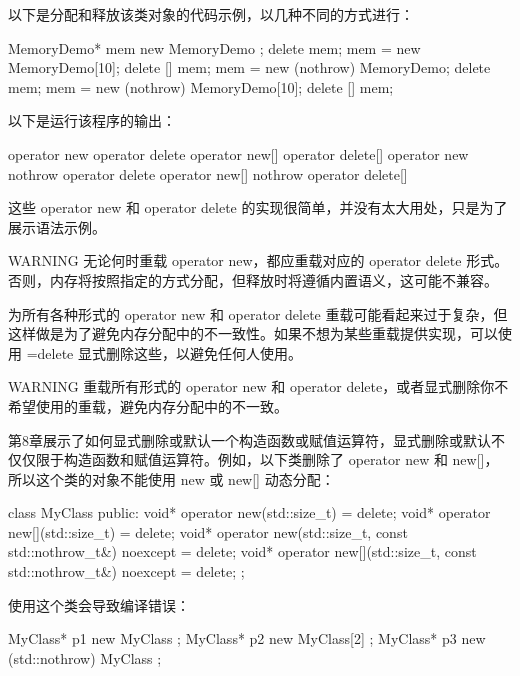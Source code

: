 以下是分配和释放该类对象的代码示例，以几种不同的方式进行：

\begin{cpp}
MemoryDemo* mem { new MemoryDemo{} };
delete mem;
mem = new MemoryDemo[10];
delete [] mem;
mem = new (nothrow) MemoryDemo{};
delete mem;
mem = new (nothrow) MemoryDemo[10];
delete [] mem;
\end{cpp}

以下是运行该程序的输出：

\begin{shell}
operator new
operator delete
operator new[]
operator delete[]
operator new nothrow
operator delete
operator new[] nothrow
operator delete[]
\end{shell}

这些 operator new 和 operator delete 的实现很简单，并没有太大用处，只是为了展示语法示例。

\begin{myWarning}{WARNING}
无论何时重载 operator new，都应重载对应的 operator delete 形式。否则，内存将按照指定的方式分配，但释放时将遵循内置语义，这可能不兼容。
\end{myWarning}

为所有各种形式的 operator new 和 operator delete 重载可能看起来过于复杂，但这样做是为了避免内存分配中的不一致性。如果不想为某些重载提供实现，可以使用 =delete 显式删除这些，以避免任何人使用。

\begin{myWarning}{WARNING}
重载所有形式的 operator new 和 operator delete，或者显式删除你不希望使用的重载，避免内存分配中的不一致。
\end{myWarning}


第8章展示了如何显式删除或默认一个构造函数或赋值运算符，显式删除或默认不仅仅限于构造函数和赋值运算符。例如，以下类删除了 operator new 和 new[]，所以这个类的对象不能使用 new 或 new[] 动态分配：

\begin{cpp}
class MyClass
{
    public:
        void* operator new(std::size_t) = delete;
        void* operator new[](std::size_t) = delete;
        void* operator new(std::size_t, const std::nothrow_t&) noexcept = delete;
        void* operator new[](std::size_t, const std::nothrow_t&) noexcept = delete;
};
\end{cpp}

使用这个类会导致编译错误：

\begin{cpp}
MyClass* p1 { new MyClass };
MyClass* p2 { new MyClass[2] };
MyClass* p3 { new (std::nothrow) MyClass };
\end{cpp}

